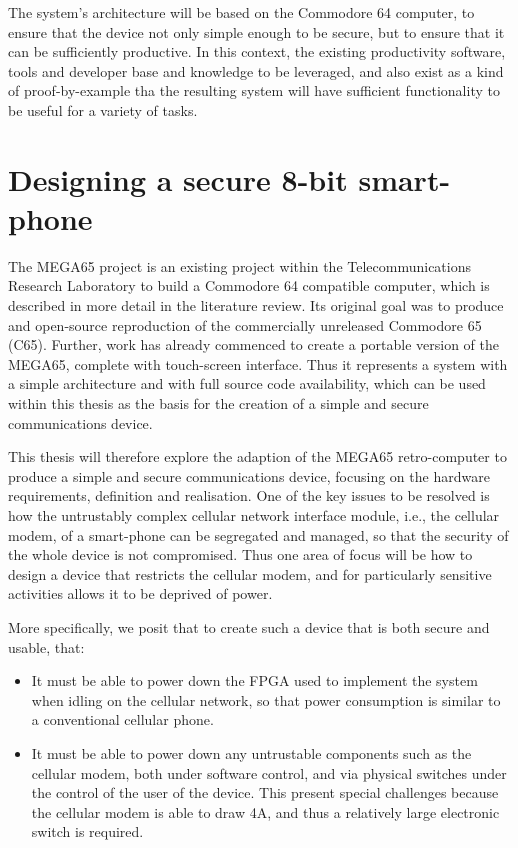 The system’s architecture will be based on the Commodore 64 computer, to ensure that the device not only simple enough to be secure, but to ensure that it can be sufficiently productive. In this context, the existing productivity software, tools and developer base and knowledge to be leveraged, and also exist as a kind of proof-by-example tha the resulting system will have sufficient functionality to be useful for a variety of tasks.


\section{Designing a secure 8-bit smart-phone}
  
The MEGA65 project is an existing project within the Telecommunications Research Laboratory to build a Commodore 64 compatible computer, which is described in more detail in the literature review.
Its original goal was to produce and open-source reproduction of the commercially unreleased Commodore 65 (C65).
Further, work has already commenced to create a portable version of the MEGA65, complete with touch-screen interface.
Thus it represents a system with a simple architecture and with full source code availability, which can be used within this thesis as the basis for the creation of a simple and secure communications device.

This thesis will therefore explore the adaption of the MEGA65 retro-computer to produce a simple and secure communications device, focusing
on the hardware requirements, definition and realisation.
One of the key issues to be resolved is how the untrustably complex cellular network interface module, i.e., the cellular modem, of a smart-phone can be segregated and managed, so that the security of the whole device is not compromised.
Thus one area of focus will be how to design a device that restricts the cellular modem, and for particularly sensitive activities allows it to be deprived of power.

More specifically, we posit that to create such a device that is both secure and usable, that:
\begin{itemize}
\item It must be able to power down the FPGA used to implement the system when idling on the cellular network, so that power consumption is similar to a conventional cellular phone.
\item It must be able to power down any untrustable components such as the cellular modem, both under software control, and via physical switches under the control of the user of the device. This present special challenges because the cellular modem is able to draw 4A, and thus a relatively large electronic switch is required.
\end{itemize}

